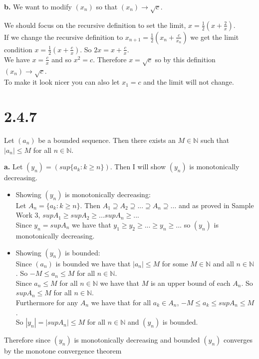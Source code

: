 \documentclass{article}
\begin{document}
{\Large \textbf{b.}} We want to modify $(x_n)$ so that $(x_n)\rightarrow\sqrt{c}$.
\begin{center}
    \doublespacing
    We should focus on the recursive definition to set the limit, $x =\frac{1}{2} (x +\frac{2}{x})$.
    \\If we change the recursive definition to $x_{n+1} =\frac{1}{2} (x_n +\frac{c}{x_n})$ we get the limit condition $x =\frac{1}{2} (x +\frac{c}{x})$. So $2x = x +\frac{c}{x}$. 
    \\We have $x =\frac{c}{x}$ and so $x^2 = c$. Therefore $x =\sqrt{c}$ so by this definition $(x_n)\rightarrow\sqrt{c}$.
    \\To make it look nicer you can also let $x_1 = c$ and the limit will not change.
\end{center}


\newpage
\section*{2.4.7}
\begin{center}
    Let $(a_n)$ be a bounded sequence. Then there exists an $M\in\mathbb{N}$ such that $|a_n|\leq M$ for all $n\in\mathbb{N}$.
\end{center}

{\Large \textbf{a.}} Let $(y_n) = (sup\{a_k : k\geq n\})$. Then I will show $(y_n)$ is monotonically decreasing.
\begin{center}
    \doublespacing
    \begin{itemize}
        \item Showing $(y_n)$ is monotonically decreasing:
        \\ Let $A_n = \{a_k : k\geq n\}$. Then $A_1\supseteq A_2\supseteq ...\supseteq A_n\supseteq ...$ and as proved in Sample Work 3, $sup A_1\geq sup A_2\geq ... sup A_n\geq ...$
        \\Since $y_n = sup A_n$ we have that $y_1\geq y_2\geq ...\geq y_n\geq ...$ so $(y_n)$ is monotonically decreasing.
        \item Showing $(y_n)$ is bounded:
        \\Since $(a_n)$ is bounded we have that $|a_n|\leq M$ for some $M\in\mathbb{N}$ and all $n\in\mathbb{N}$. So $-M\leq a_n\leq M$ for all $n\in\mathbb{N}$.
        \\Since $a_n\leq M$ for all $n\in\mathbb{N}$ we have that $M$ is an upper bound of each $A_n$. So $sup A_n\leq M$ for all $n\in\mathbb{N}$.
        \\Furthermore for any $A_n$ we have that for all $a_k\in A_n$, $-M\leq a_k\leq sup A_n\leq M$.
        \\So $|y_n| = |sup A_n|\leq M$ for all $n\in\mathbb{N}$ and $(y_n)$ is bounded.
    \end{itemize}
    Therefore since $(y_n)$ is monotonically decreasing and bounded $(y_n)$ converges by the monotone convergence theorem \qedsymbol
\end{center}
\end{document}
